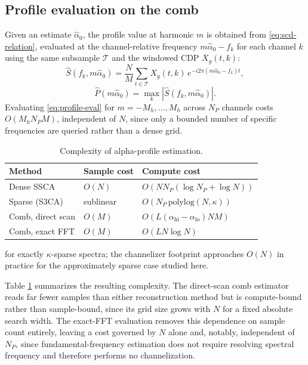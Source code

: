 \documentclass[10pt,twocolumn]{article}
\begin{document}
\subsection{Profile evaluation on the comb}
Given an estimate $\hat\alpha_0$, the profile value at harmonic $m$ is
obtained from \eqref{eq:scd-relation}, evaluated at the channel-relative
frequency $m\hat\alpha_0 - f_k$ for each channel $k$ using the same
subsample $\mathcal{T}$ and the windowed CDP $X_g(t,k)$:
\begin{equation}
\widehat{S}(f_k, m\hat\alpha_0) = \frac{N}{M}
  \sum_{t \in \mathcal{T}} X_g(t,k)\,
  e^{-i2\pi (m\hat\alpha_0 - f_k) t},
\end{equation}
\begin{equation}
\widehat{P}(m\hat\alpha_0) = \max_{k} \left| \widehat{S}(f_k,
  m\hat\alpha_0) \right|.
\label{eq:profile-eval}
\end{equation}
Evaluating \eqref{eq:profile-eval} for $m = -M_h,\dots,M_h$ across $N_P$
channels costs $O(M_h N_P M)$, independent of $N$, since only a bounded
number of specific frequencies are queried rather than a dense grid.

\begin{table}[t]
\centering
\caption{Complexity of alpha-profile estimation.}
\label{tab:complexity}
\begin{threeparttable}
\small
\begin{tabular}{@{}lll@{}}
\toprule
Method & Sample cost & Compute cost \\
\midrule
Dense SSCA & $O(N)$ & $O(NN_P(\log N_P + \log N))$ \\
Sparse (S3CA) & sublinear\tnote{*} & $O(N_P \,\mathrm{polylog}(N,\kappa))$ \\
Comb, direct scan & $O(M)$ & $O(L(\alpha_{\text{hi}}-\alpha_{\text{lo}})NM)$ \\
Comb, exact FFT & $O(M)$ & $O(LN\log N)$ \\
\bottomrule
\end{tabular}
\begin{tablenotes}
\footnotesize
\item[*] for exactly $\kappa$-sparse spectra; the channelizer footprint
approaches $O(N)$ in practice for the approximately sparse case studied
here.
\end{tablenotes}
\end{threeparttable}
\end{table}

Table \ref{tab:complexity} summarizes the resulting complexity. The
direct-scan comb estimator reads far fewer samples than either
reconstruction method but is compute-bound rather than sample-bound, since
its grid size grows with $N$ for a fixed absolute search width. The
exact-FFT evaluation removes this dependence on sample count entirely,
leaving a cost governed by $N$ alone and, notably, independent of $N_P$,
since fundamental-frequency estimation does not require resolving spectral
frequency and therefore performs no channelization.
\end{document}
